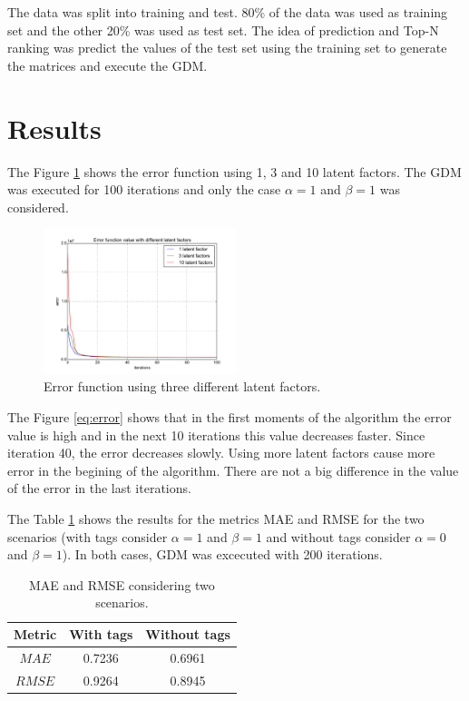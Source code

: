 \documentclass{sig-alternate}
\begin{document}
The data was split into training and test. 80\% of the data was used as training set and the other 20\% was used as test set. The idea of prediction and Top-N ranking was predict the values of the test set using the training set to generate the matrices and execute the GDM.

\section{Results}

The Figure \ref{fig:error} shows the error function using 1, 3 and 10 latent factors. The GDM was executed for 100 iterations and only the case $\alpha=1$ and $\beta=1$ was considered.

\begin{figure}[!htb]
\centering
\includegraphics[width=0.5\textwidth]{exp1}
\caption{Error function using three different latent factors.}
\label{fig:error}
\end{figure}

The Figure \ref{eq:error} shows that in the first moments of the algorithm the error value is high and in the next 10 iterations this value decreases faster. Since iteration 40, the error decreases slowly. Using more latent factors cause more error in the begining of the algorithm. There are not a big difference in the value of the error in the last iterations.  

The Table \ref{tab:metric1} shows the results for the metrics MAE and RMSE for the two scenarios (with tags consider $\alpha=1$ and $\beta=1$ and without tags consider $\alpha=0$ and $\beta=1$). In both cases, GDM was excecuted with 200 iterations.

\begin{table}[!htb]
\caption{MAE and RMSE considering two scenarios.}
\centering
\begin{tabular}{|c|c|c|}
\hline
Metric & With tags & Without tags\\ \hline \hline
$MAE$ & 0.7236 & 0.6961\\ \hline
$RMSE$ & 0.9264 & 0.8945\\
\hline
\end{tabular}
\label{tab:metric1}
\end{table}
\end{document}
